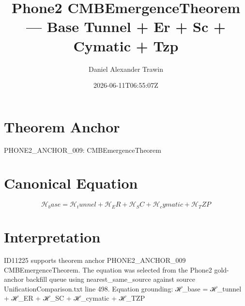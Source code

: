 \documentclass[11pt]{article}
\title{Phone2 CMBEmergenceTheorem — Base Tunnel + Er + Sc + Cymatic + Tzp}
\author{Daniel Alexander Trawin}
\date{2026-06-11T06:55:07Z}
\begin{document}
\maketitle
\section*{Theorem Anchor}
PHONE2_ANCHOR_009: CMBEmergenceTheorem
\section*{Canonical Equation}
\[
ℋ_base = ℋ_tunnel + ℋ_ER + ℋ_SC + ℋ_cymatic + ℋ_TZP
\]
\section*{Interpretation}
ID11225 supports theorem anchor PHONE2_ANCHOR_009 CMBEmergenceTheorem. The equation was selected from the Phone2 gold-anchor backfill queue using nearest_same_source against source UnificationComparison.txt line 498. Equation grounding: ℋ_base = ℋ_tunnel + ℋ_ER + ℋ_SC + ℋ_cymatic + ℋ_TZP
\end{document}
